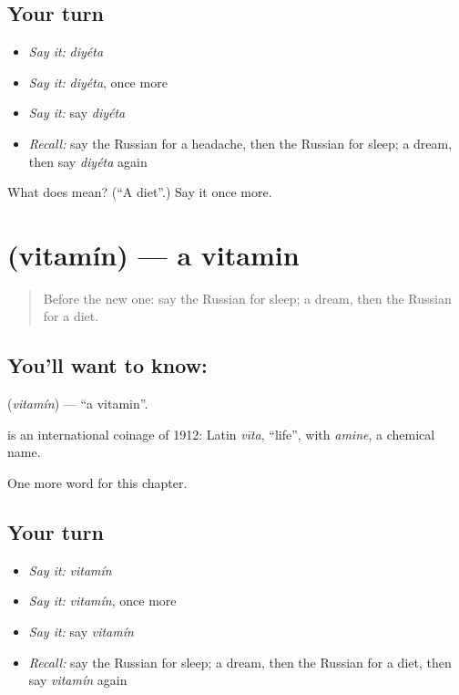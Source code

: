 \subsection*{Your turn}
\begin{itemize}
\raggedright
  \item \emph{Say it:} \emph{diyéta}
  \item \emph{Say it:} \emph{diyéta}, once more
  \item \emph{Say it:} say \emph{diyéta}
  \item \emph{Recall:} say the Russian for a headache, then the Russian for sleep; a dream, then say \emph{diyéta} again
\end{itemize}

\begin{tcolorbox}[breakable,colback=teal!4,colframe=teal!35!black,title={Before you move on}]
What does  mean? (\textquotedblleft{}A diet\textquotedblright{}.) Say it once more.
\end{tcolorbox}
\section[\texorpdfstring{\ru{витамин} (vitamín)}{витамин (vitamín)}]{ (vitamín) — a vitamin}

\label{lesson:RU-C180-vitamin}



\begin{quote}
Before the new one: say the Russian for sleep; a dream, then the Russian for a diet.
\end{quote}

\subsection*{You'll want to know: }
\textbf{} (\emph{vitamín}) — \textquotedblleft{}a vitamin\textquotedblright{}.

\begin{cousinweb}
\textbf{} is an international coinage of 1912: Latin \emph{vīta}, \textquotedblleft{}life\textquotedblright{}, with \emph{amine}, a chemical name.
\end{cousinweb}

\begin{grammarlens}[title={What you've built}]
One more word for this chapter.
\end{grammarlens}

\subsection*{Your turn}
\begin{itemize}
\raggedright
  \item \emph{Say it:} \emph{vitamín}
  \item \emph{Say it:} \emph{vitamín}, once more
  \item \emph{Say it:} say \emph{vitamín}
  \item \emph{Recall:} say the Russian for sleep; a dream, then the Russian for a diet, then say \emph{vitamín} again
\end{itemize}


